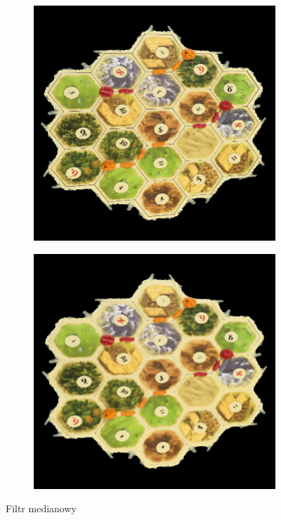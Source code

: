 \documentclass[a4paper]{article}
\begin{document}
    \begin{figure}[h]
        \begin{subfigure}[]{.5\linewidth}
        \includegraphics[width=\linewidth]{pictures/fields/pre_blur.png}

        \end{subfigure}
        \begin{subfigure}[]{0.5\linewidth}
        \includegraphics[width=\linewidth]{pictures/fields/after_blur.png}
        \end{subfigure}

        \caption{Filtr medianowy}
        \label{fig:step3}
    \end{figure}
    
\end{document}

